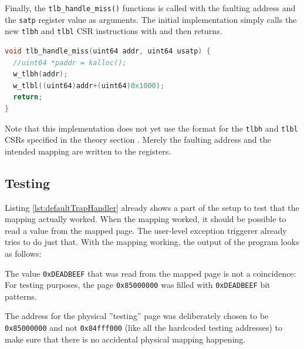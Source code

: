 Finally, the \texttt{tlb\_handle\_miss()} functions is called with the faulting address and the \texttt{satp} register
value as arguments.
The initial implementation simply calls the new \texttt{tlbh} and \texttt{tlbl} CSR instructions with and then
returns.
\begin{lstlisting}[language={C},float=h!,
    label={lst:defaultTrapHandler}, caption={Simple TLB Miss Exception handler for a single fixed address}]
void tlb_handle_miss(uint64 addr, uint64 usatp) {
  //uint64 *paddr = kalloc();
  w_tlbh(addr);
  w_tlbl((uint64)addr+(uint64)0x1000);
  return;
}
\end{lstlisting}

Note that this implementation does not yet use the format for the \texttt{tlbh} and \texttt{tlbl} CSRs specified
in the theory section .
Merely the faulting address and the intended mapping are written to the registers.

\subsection{Testing}
Listing \ref{lst:defaultTrapHandler} already shows a part of the setup to test that the mapping actually worked.
When the mapping worked, it should be possible to read a value from the mapped page.
The user-level exception triggerer already tries to do just that.
With the mapping working, the output of the program looks as follows:


The value \texttt{0xDEADBEEF} that was read from the mapped page is not a coincidence:
For testing purposes, the page \texttt{0x85000000} was filled with \texttt{0xDEADBEEF} bit patterns.

The address for the physical ''testing'' page was deliberately chosen to be \texttt{0x85000000} and not
\texttt{0x84fff000} (like all the hardcoded testing addresses) to make sure that there is no accidental physical
mapping happening.






